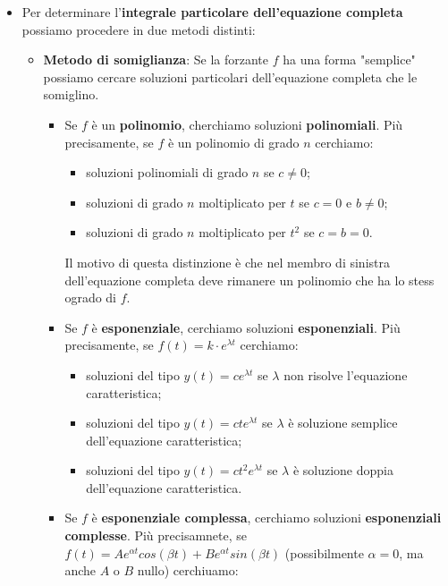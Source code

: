 \begin{itemize}
    \item Per determinare l'\textbf{integrale particolare dell'equazione completa} possiamo procedere in due metodi distinti:
    \begin{itemize}
        \item \textbf{Metodo di somiglianza}:\newline
        Se la forzante $f$ ha una forma "semplice" possiamo cercare soluzioni particolari dell'equazione completa che le somiglino.
        \begin{itemize}
            \item Se $f$ è un \textbf{polinomio}, cherchiamo soluzioni \textbf{polinomiali}.\newline
            Più precisamente, se $f$ è un polinomio di grado $n$ cerchiamo:
            \begin{itemize}
                \item soluzioni polinomiali di grado $n$ se $c \neq 0$;
                \item soluzioni di grado $n$ moltiplicato per $t$ se $c=0$ e $b\neq 0$;
                \item soluzioni di grado $n$ moltiplicato per $t^2$ se $c=b=0$.
            \end{itemize}
            Il motivo di questa distinzione è che nel membro di sinistra dell'equazione completa deve rimanere un polinomio che ha lo stess ogrado di $f$.
            \item Se $f$ è \textbf{esponenziale}, cerchiamo soluzioni \textbf{esponenziali}.\newline
            Più precisamente, se $f(t) = k \cdot  e^{\lambda t}$ cerchiamo:
            \begin{itemize}
                \item soluzioni del tipo $y(t) = ce^{\lambda t}$ se $\lambda$ non risolve l'equazione caratteristica;
                \item soluzioni del tipo $y(t) = cte^{\lambda t}$ se $\lambda$ è soluzione semplice dell'equazione caratteristica;
                \item soluzioni del tipo $y(t) = ct^2e^{\lambda t}$ se $\lambda$ è soluzione doppia dell'equazione caratteristica.
            \end{itemize}
            \item Se $f$ è \textbf{esponenziale complessa}, cerchiamo soluzioni \textbf{esponenziali complesse}.\newline
            Più precisamnete, se $f(t) = Ae^{\alpha t} cos(\beta t) + Be^{\alpha t} sin(\beta t)$ (possibilmente $\alpha = 0$, ma anche $A$ o $B$ nullo) cerchiuamo:

\end{itemize}
\end{itemize}
\end{itemize}
